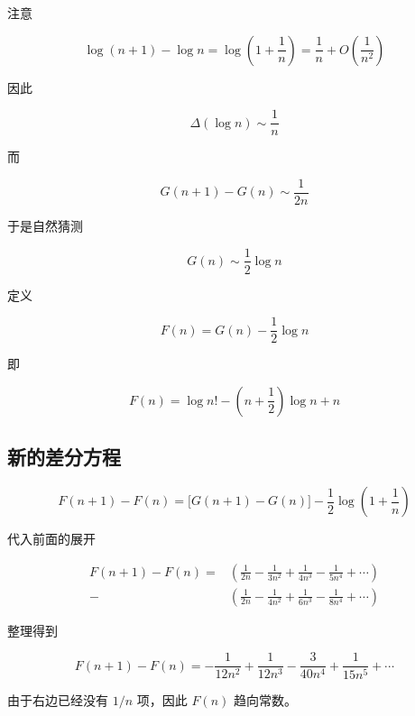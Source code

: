 \documentclass[11pt]{article}%
\begin{document}
    注意

    \[
    \log(n+1)-\log n
    =
    \log\!\left(1+\frac1n\right)
    =
    \frac1n+O\!\left(\frac1{n^2}\right)
    \]

    \vspace{1em}
    因此

    \[
    \varDelta(\log n)
    \sim
    \frac1n
    \]

    \vspace{1em}
    而

    \[
    G(n+1)-G(n)
    \sim
    \frac1{2n}
    \]

    \vspace{1em}
    于是自然猜测

    \[
    G(n)
    \sim
    \frac12\log n
    \]

    \vspace{1em}
    定义

    \[
    F(n)
    =
    G(n)-\frac12\log n
    \]

    \vspace{1em}
    即

    \[
    \boxed{
    F(n)
    =
    \log n!
    -
    \left(n+\frac12\right)\log n
    +n
    }
    \]

    \subsection{新的差分方程}

    \[
    F(n+1)-F(n)
    =
    \bigl[G(n+1)-G(n)\bigr]
    -\frac12
    \log\!\left(1+\frac1n\right)
    \]

    \vspace{1em}
    代入前面的展开

    \[
    \begin{aligned}
    F(n+1)-F(n)
    =
    &\left(
    \frac1{2n}
    -\frac1{3n^2}
    +\frac1{4n^3}
    -\frac1{5n^4}
    +\cdots
    \right)
    \\
    -
    &\left(
    \frac1{2n}
    -\frac1{4n^2}
    +\frac1{6n^3}
    -\frac1{8n^4}
    +\cdots
    \right)
    \end{aligned}
    \]

    \vspace{1em}
    整理得到

    \[
    \boxed{
    F(n+1)-F(n)
    =
    -\frac1{12n^2}
    +\frac1{12n^3}
    -\frac3{40n^4}
    +\frac1{15n^5}
    +\cdots 
    }
    \]

    \vspace{1em}
    由于右边已经没有 \(1/n\) 项，因此 \(F(n)\) 趋向常数。
\end{document}
